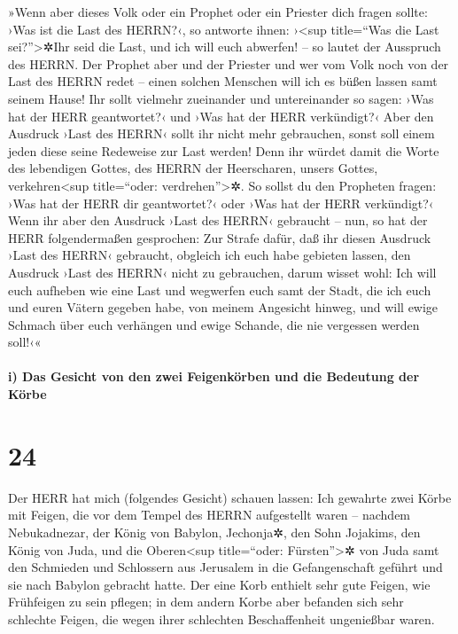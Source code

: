 »Wenn aber dieses Volk oder ein Prophet oder ein Priester
dich fragen sollte: ›Was ist die Last des HERRN?‹, so antworte ihnen:
›\textless sup title=``Was die Last sei?''\textgreater✲Ihr seid die
Last, und ich will euch abwerfen! -- so lautet der Ausspruch des HERRN.
Der Prophet aber und der Priester und wer vom Volk noch
von der Last des HERRN redet -- einen solchen Menschen will ich es büßen
lassen samt seinem Hause! Ihr sollt vielmehr zueinander
und untereinander so sagen: ›Was hat der HERR geantwortet?‹ und ›Was hat
der HERR verkündigt?‹ Aber den Ausdruck ›Last des HERRN‹
sollt ihr nicht mehr gebrauchen, sonst soll einem jeden diese seine
Redeweise zur Last werden! Denn ihr würdet damit die Worte des
lebendigen Gottes, des HERRN der Heerscharen, unsers Gottes,
verkehren\textless sup title=``oder: verdrehen''\textgreater✲.
So sollst du den Propheten fragen: ›Was hat der HERR dir
geantwortet?‹ oder ›Was hat der HERR verkündigt?‹ Wenn
ihr aber den Ausdruck ›Last des HERRN‹ gebraucht -- nun, so hat der HERR
folgendermaßen gesprochen: Zur Strafe dafür, daß ihr diesen Ausdruck
›Last des HERRN‹ gebraucht, obgleich ich euch habe gebieten lassen, den
Ausdruck ›Last des HERRN‹ nicht zu gebrauchen, darum
wisset wohl: Ich will euch aufheben wie eine Last und wegwerfen euch
samt der Stadt, die ich euch und euren Vätern gegeben habe, von meinem
Angesicht hinweg, und will ewige Schmach über euch
verhängen und ewige Schande, die nie vergessen werden soll!‹«

\hypertarget{i-das-gesicht-von-den-zwei-feigenkuxf6rben-und-die-bedeutung-der-kuxf6rbe}{%
\paragraph{i) Das Gesicht von den zwei Feigenkörben und die Bedeutung
der
Körbe}\label{i-das-gesicht-von-den-zwei-feigenkuxf6rben-und-die-bedeutung-der-kuxf6rbe}}

\hypertarget{section-23}{%
\section{24}\label{section-23}}

Der HERR hat mich (folgendes Gesicht) schauen lassen: Ich
gewahrte zwei Körbe mit Feigen, die vor dem Tempel des HERRN aufgestellt
waren -- nachdem Nebukadnezar, der König von Babylon, Jechonja✲, den
Sohn Jojakims, den König von Juda, und die Oberen\textless sup
title=``oder: Fürsten''\textgreater✲ von Juda samt den Schmieden und
Schlossern aus Jerusalem in die Gefangenschaft geführt und sie nach
Babylon gebracht hatte. Der eine Korb enthielt sehr gute
Feigen, wie Frühfeigen zu sein pflegen; in dem andern Korbe aber
befanden sich sehr schlechte Feigen, die wegen ihrer schlechten
Beschaffenheit ungenießbar waren.

